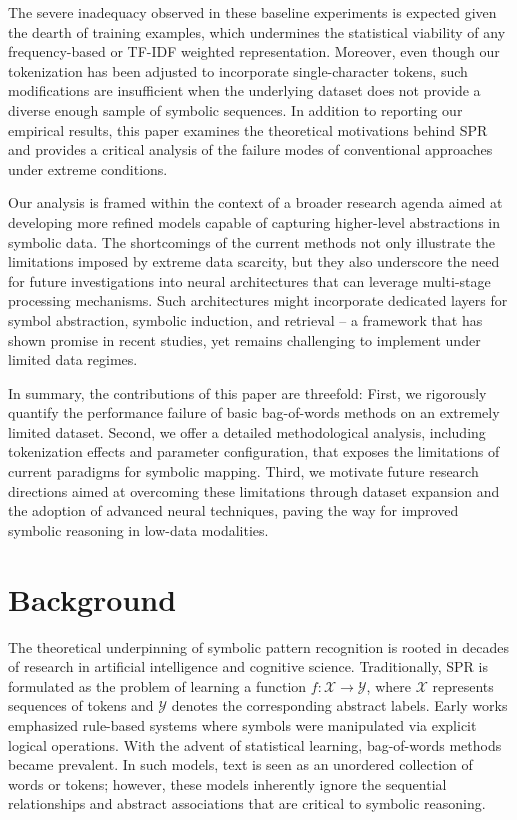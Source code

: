 \documentclass{article}
\begin{document}
The severe inadequacy observed in these baseline experiments is expected given the dearth of training examples, which undermines the statistical viability of any frequency-based or TF-IDF weighted representation. Moreover, even though our tokenization has been adjusted to incorporate single-character tokens, such modifications are insufficient when the underlying dataset does not provide a diverse enough sample of symbolic sequences. In addition to reporting our empirical results, this paper examines the theoretical motivations behind SPR and provides a critical analysis of the failure modes of conventional approaches under extreme conditions.

Our analysis is framed within the context of a broader research agenda aimed at developing more refined models capable of capturing higher-level abstractions in symbolic data. The shortcomings of the current methods not only illustrate the limitations imposed by extreme data scarcity, but they also underscore the need for future investigations into neural architectures that can leverage multi-stage processing mechanisms. Such architectures might incorporate dedicated layers for symbol abstraction, symbolic induction, and retrieval – a framework that has shown promise in recent studies, yet remains challenging to implement under limited data regimes.

In summary, the contributions of this paper are threefold: First, we rigorously quantify the performance failure of basic bag-of-words methods on an extremely limited dataset. Second, we offer a detailed methodological analysis, including tokenization effects and parameter configuration, that exposes the limitations of current paradigms for symbolic mapping. Third, we motivate future research directions aimed at overcoming these limitations through dataset expansion and the adoption of advanced neural techniques, paving the way for improved symbolic reasoning in low-data modalities.

\section{Background}
The theoretical underpinning of symbolic pattern recognition is rooted in decades of research in artificial intelligence and cognitive science. Traditionally, SPR is formulated as the problem of learning a function \( f: \mathcal{X} \to \mathcal{Y} \), where \(\mathcal{X}\) represents sequences of tokens and \(\mathcal{Y}\) denotes the corresponding abstract labels. Early works emphasized rule-based systems where symbols were manipulated via explicit logical operations. With the advent of statistical learning, bag-of-words methods became prevalent. In such models, text is seen as an unordered collection of words or tokens; however, these models inherently ignore the sequential relationships and abstract associations that are critical to symbolic reasoning.
\end{document}
